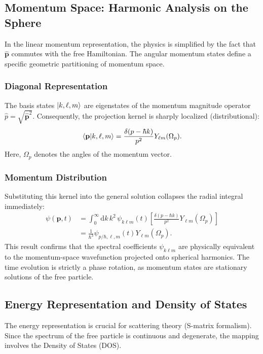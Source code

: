 \subsection{Momentum Space: Harmonic Analysis on the Sphere}

In the linear momentum representation, the physics is simplified by the fact that
$\hat{\mathbf{p}}$ commutes with the free Hamiltonian. The angular momentum
states define a specific geometric partitioning of momentum space.

\subsubsection{Diagonal Representation}
The basis states $\ket{k, \ell, m}$ are eigenstates of the momentum magnitude
operator $\hat{p} = \sqrt{\hat{\mathbf{p}}^2}$. Consequently, the projection
kernel is sharply localized (distributional):
\begin{equation}
	\braket{\mathbf{p} | k, \ell, m} = \frac{\delta(p - \hbar k)}{p^2}
	Y_{\ell m}(\Omega_p).
\end{equation}
Here, $\Omega_p$ denotes the angles of the momentum vector.

\subsubsection{Momentum Distribution}
Substituting this kernel into the general solution collapses the radial integral
immediately:
\begin{align}
	\psi(\mathbf{p}, t) &= \int_0^\infty \mathrm{d}k \, k^2 \, \psi_{k\ell m}(t)
	\left[ \frac{\delta(p - \hbar k)}{p^2} Y_{\ell m}(\Omega_p) \right]
	\nonumber \\
											&= \frac{1}{\hbar^3} \psi_{p/\hbar, \ell, m}(t) Y_{\ell m}(\Omega_p).
\end{align}
This result confirms that the spectral coefficients $\psi_{k\ell m}$ are
physically equivalent to the momentum-space wavefunction projected onto
spherical harmonics. The time evolution is strictly a phase rotation, as
momentum states are stationary solutions of the free particle.

\subsection{Energy Representation and Density of States}

The energy representation is crucial for scattering theory (S-matrix formalism).
Since the spectrum of the free particle is continuous and degenerate, the
mapping involves the Density of States (DOS).

